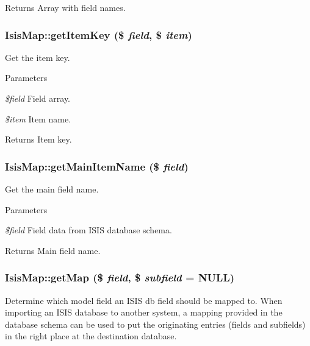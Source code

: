\begin{DoxyReturn}{Returns}
Array with field names. 
\end{DoxyReturn}
\hypertarget{classIsisMap_a994934784caa4149737bda55160a459f}{
\subsubsection[{getItemKey}]{\setlength{\rightskip}{0pt plus 5cm}IsisMap::getItemKey (\$ {\em field}, \/  \$ {\em item})}}
\label{classIsisMap_a994934784caa4149737bda55160a459f}
Get the item key.


\begin{DoxyParams}{Parameters}
\item[{\em \$field}]Field array.\item[{\em \$item}]Item name.\end{DoxyParams}
\begin{DoxyReturn}{Returns}
Item key. 
\end{DoxyReturn}
\hypertarget{classIsisMap_af689f27e67b0b38a3e880ead17a487f5}{
\subsubsection[{getMainItemName}]{\setlength{\rightskip}{0pt plus 5cm}IsisMap::getMainItemName (\$ {\em field})}}
\label{classIsisMap_af689f27e67b0b38a3e880ead17a487f5}
Get the main field name.


\begin{DoxyParams}{Parameters}
\item[{\em \$field}]Field data from ISIS database schema.\end{DoxyParams}
\begin{DoxyReturn}{Returns}
Main field name. 
\end{DoxyReturn}
\hypertarget{classIsisMap_a29eb2c45b51f95fdfb9ff7af770ca6ce}{
\subsubsection[{getMap}]{\setlength{\rightskip}{0pt plus 5cm}IsisMap::getMap (\$ {\em field}, \/  \$ {\em subfield} = {\ttfamily NULL})}}
\label{classIsisMap_a29eb2c45b51f95fdfb9ff7af770ca6ce}
Determine which model field an ISIS db field should be mapped to. When importing an ISIS database to another system, a mapping provided in the database schema can be used to put the originating entries (fields and subfields) in the right place at the destination database.

